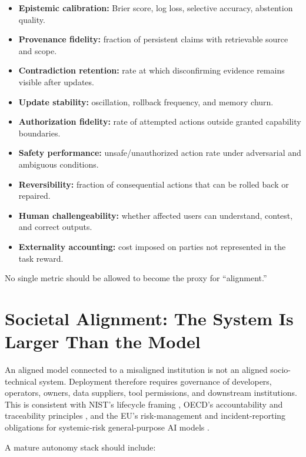 \documentclass[11pt]{article}
\begin{document}
\begin{itemize}
    \item \textbf{Epistemic calibration:} Brier score, log loss, selective accuracy, abstention quality.
    \item \textbf{Provenance fidelity:} fraction of persistent claims with retrievable source and scope.
    \item \textbf{Contradiction retention:} rate at which disconfirming evidence remains visible after updates.
    \item \textbf{Update stability:} oscillation, rollback frequency, and memory churn.
    \item \textbf{Authorization fidelity:} rate of attempted actions outside granted capability boundaries.
    \item \textbf{Safety performance:} unsafe/unauthorized action rate under adversarial and ambiguous conditions.
    \item \textbf{Reversibility:} fraction of consequential actions that can be rolled back or repaired.
    \item \textbf{Human challengeability:} whether affected users can understand, contest, and correct outputs.
    \item \textbf{Externality accounting:} cost imposed on parties not represented in the task reward.
\end{itemize}

No single metric should be allowed to become the proxy for ``alignment.''

\section{Societal Alignment: The System Is Larger Than the Model}

An aligned model connected to a misaligned institution is not an aligned socio-technical system. Deployment therefore requires governance of developers, operators, owners, data suppliers, tool permissions, and downstream institutions. This is consistent with NIST's lifecycle framing \cite{nist2023,nist2024}, OECD's accountability and traceability principles \cite{oecd2024}, and the EU's risk-management and incident-reporting obligations for systemic-risk general-purpose AI models \cite{eu2025}.

A mature autonomy stack should include:
\end{document}
